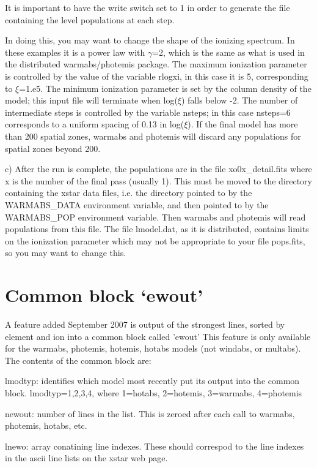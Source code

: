 It is important to have the write switch set to 1 in order to 
generate the file containing the level populations at each step.

In doing this, you may want to change the shape of the ionizing spectrum.
In these examples it is a power law with $\gamma$=2, which is the 
same as what is used in the distributed warmabs/photemis package.
The maximum ionization parameter is controlled by the 
value of the variable rlogxi, in this case it is 5, corresponding
to $\xi$=1.e5.  The minimum ionization parameter
is set by the column density of the model; this input file 
will terminate when log($\xi$) falls below -2.  The number of 
intermediate steps is controlled by the variable nsteps; in this case
nsteps=6 corresponds to a uniform spacing of 0.13 in log($\xi$).
If the final model has more than 200 spatial zones, warmabs and photemis 
will discard any populations for spatial zones beyond 200.

c) After the run is complete, the populations are in the file xo0x\_detail.fits
where x is the number of the final pass (usually 1).
This must be moved to the directory containing the xstar data files, i.e. the 
directory pointed to by the WARMABS\_DATA environment variable, and then 
pointed to by the WARMABS\_POP environment variable.  Then warmabs 
and photemis will read populations from this file.
The file lmodel.dat, as it is distributed, contains limits on the 
ionization parameter which may not be appropriate to your file pops.fits, so 
you may want to change this.

\section{Common block `ewout'}


A feature added September 2007 is output of the strongest lines, 
sorted by element and ion into a common block called 'ewout'
This feature is only available for the warmabs, photemis, hotemis, hotabs  
models (not windabs, or multabs). The contents of the common block are:

lmodtyp: identifies which model most recently put its output into the 
         common block.  lmodtyp=1,2,3,4, where 1=hotabs,
         2=hotemis, 3=warmabs, 4=photemis 

newout:  number of lines in the list.  This is zeroed after each call to warmabs, 
         photemis, hotabs, etc.

lnewo:   array conatining line indexes.  These should correspod to the line indexes 
         in the ascii line lists on the xstar web page.

